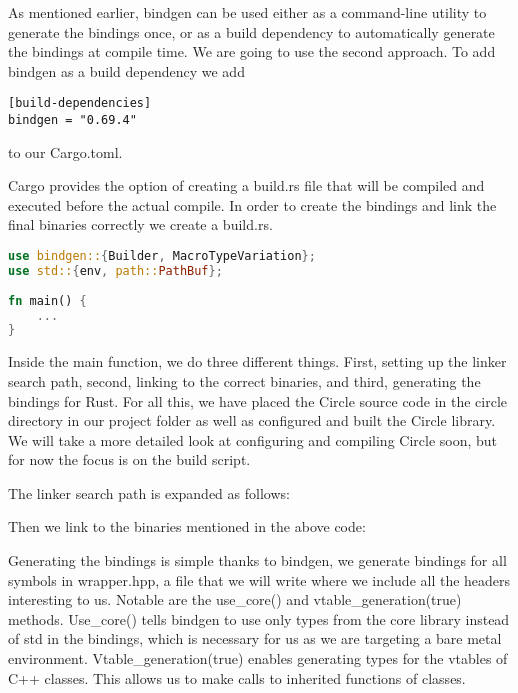 As mentioned earlier, bindgen can be used either as a command-line utility to generate the bindings once,
or as a build dependency to automatically generate the bindings at compile time.
We are going to use the second approach.
To add bindgen as a build dependency we add
\begin{verbatim}
[build-dependencies]
bindgen = "0.69.4"
\end{verbatim}
to our Cargo.toml.

Cargo provides the option of creating a build.rs file that will be compiled and executed before the actual compile.
In order to create the bindings and link the final binaries correctly we create a build.rs.
\begin{lstlisting}[language=Rust,style=colouredRust]
use bindgen::{Builder, MacroTypeVariation};
use std::{env, path::PathBuf};
    
fn main() {
    ...
}    
\end{lstlisting}

Inside the main function, we do three different things.
First, setting up the linker search path, second, linking to the correct binaries, and third, generating the bindings for Rust.
For all this, we have placed the Circle source code in the circle directory in our project folder as well as configured and built the Circle library.
We will take a more detailed look at configuring and compiling Circle soon, but for now the focus is on the build script.

The linker search path is expanded as follows:


Then we link to the binaries mentioned in the above code:


Generating the bindings is simple thanks to bindgen, we generate bindings for all symbols in wrapper.hpp,
a file that we will write where we include all the headers interesting to us.
Notable are the use\_core() and vtable\_generation(true) methods.
Use\_core() tells bindgen to use only types from the core library instead of std in the bindings, which is necessary for us as we are targeting a bare metal environment.
Vtable\_generation(true) enables generating types for the vtables of C++ classes.
This allows us to make calls to inherited functions of classes.


